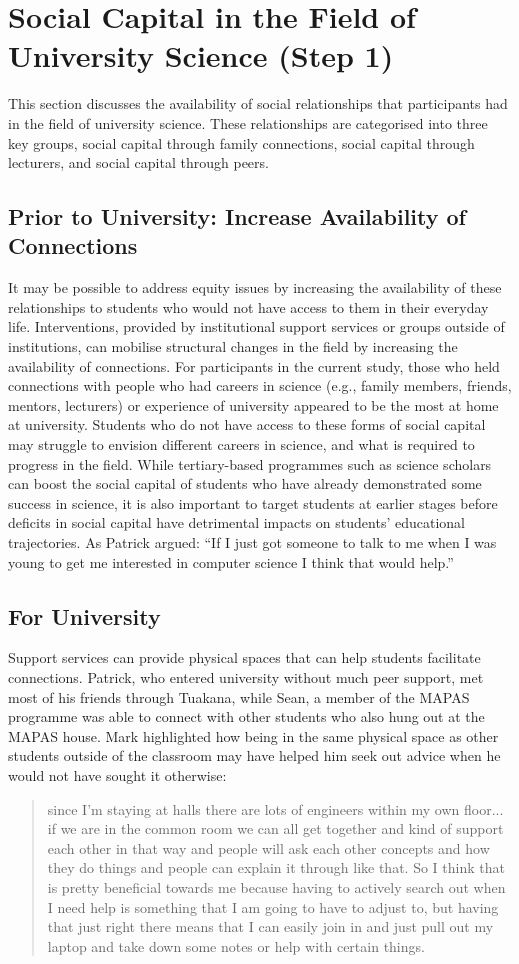 \section{Social Capital in the Field of University Science (Step 1)}
This section discusses the availability of social relationships that participants had in the field of university science. These relationships are categorised into three key groups, social capital through family connections, social capital through lecturers, and social capital through peers. 

\subsection{Prior to University: Increase Availability of Connections}
It may be possible to address equity issues by increasing the availability of these relationships to students who would not have access to them in their everyday life. Interventions, provided by institutional support services or groups outside of institutions, can mobilise structural changes in the field by increasing the availability of connections. For participants in the current study, those who held connections with people who had careers in science (e.g., family members, friends, mentors, lecturers) or experience of university appeared to be the most at home at university. Students who do not have access to these forms of social capital may struggle to envision different careers in science, and what is required to progress in the field. While tertiary-based programmes such as science scholars can boost the social capital of students who have already demonstrated some success in science, it is also important to target students at earlier stages before deficits in social capital have detrimental impacts on students' educational trajectories. As Patrick argued: ``If I just got someone to talk to me when I was young to get me interested in computer science I think that would help.''   


\subsection{For University}
Support services can provide physical spaces that can help students facilitate connections. Patrick, who entered university without much peer support, met most of his friends through Tuakana, while Sean, a member of the MAPAS programme was able to connect with other students who also hung out at the MAPAS house. Mark highlighted how being in the same physical space as other students outside of the classroom may have helped him seek out advice when he would not have sought it otherwise: \blockquote{since I’m staying at halls there are lots of engineers within my own floor... if we are in the common room we can all get together and kind of support each other in that way and people will ask each other concepts and how they do things and people can explain it through like that. So I think that is pretty beneficial towards me because having to actively search out when I need help is something that I am going to have to adjust to, but having that just right there means that I can easily join in and just pull out my laptop and take down some notes or help with certain things.}


